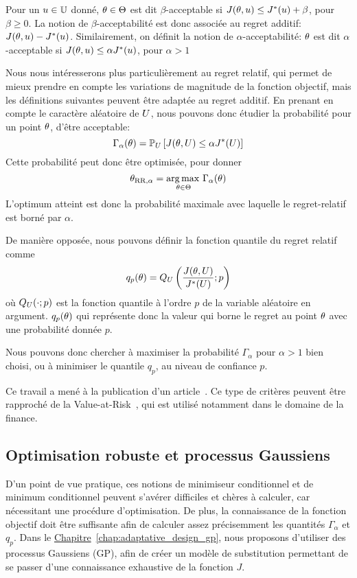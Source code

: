 \documentclass[../../Main_ManuscritThese.tex]{subfiles}
\newcommand{\frchap}[1]{\hyperref[#1]{Chapitre}~\ref{#1}}
\begin{document}
Pour un $u\in\mathbb{U}$ donné, $\theta\in\Theta$ est dit
$\beta$-acceptable si $J(\theta, u) \leq J^*(u) + \beta$, pour $\beta \geq 0$. La notion
de $\beta$-acceptabilité est donc associée au regret additif: 
$J(\theta, u) - J^*(u)$.  Similairement, on définit la notion de
$\alpha$-acceptabilité: $\theta$ est dit $\alpha$-acceptable si
$J(\theta, u) \leq \alpha J^*(u)$, pour $\alpha > 1$

Nous nous intéresserons plus particulièrement au regret relatif, qui
permet de mieux prendre en compte les variations de magnitude de la
fonction objectif, mais les définitions suivantes peuvent être adaptée
au regret additif. En prenant en compte le caractère aléatoire de
$U$, nous pouvons donc étudier la probabilité pour un point $\theta$, d'être acceptable:
\begin{equation*}
\Gamma_{\alpha}(\theta) = \mathbb{P}_{U}\left[J(\theta,U) \leq \alpha J^*(U) \right]
\end{equation*}
Cette probabilité peut donc être optimisée, pour donner
\begin{equation}
  \theta_{\mathrm{RR},\alpha} = \operatorname*{arg\,max \,}_{\theta \in\Theta} \Gamma_\alpha(\theta)
\end{equation}
L'optimum atteint est donc la probabilité maximale avec laquelle le
regret-relatif est borné par $\alpha$.


  De manière opposée, nous pouvons définir la
fonction quantile du regret relatif comme
\begin{equation}
  q_p(\theta) = Q_{U}\left(\frac{J(\theta,U)}{J^*(U)};p\right)
\end{equation}
où $Q_{U}(\cdot;p)$ est la fonction quantile à l'ordre $p$ de la
variable aléatoire en argument. $q_p(\theta)$ qui représente donc la valeur qui
borne le regret au point $\theta$ avec une probabilité donnée $p$.

Nous pouvons donc chercher à maximiser la probabilité
$\Gamma_{\alpha}$ pour $\alpha > 1$ bien choisi, ou à minimiser le
quantile $q_p$, au niveau de confiance $p$.

Ce travail a mené à la publication d'un
article~\cite{trappler_robust_2020}. Ce type de critères peuvent être
rapproché de la Value-at-Risk~\cite{rockafellar_deviation_2002}, qui
est utilisé notamment dans le domaine de la finance.

\subsection*{Optimisation robuste et processus Gaussiens}
D'un point de vue pratique, ces notions de minimiseur conditionnel et
de minimum conditionnel peuvent s'avérer difficiles et chères à
calculer, car nécessitant une procédure d'optimisation. De plus, la
connaissance de la fonction objectif doit être suffisante afin de
calculer assez précisemment les quantités $\Gamma_{\alpha}$ et $q_p$.
Dans le \frchap{chap:adaptative_design_gp}, nous proposons d'utiliser
des processus Gaussiens (GP), afin de créer un modèle de substitution
permettant de se passer d'une connaissance exhaustive de la fonction
$J$.
\end{document}
